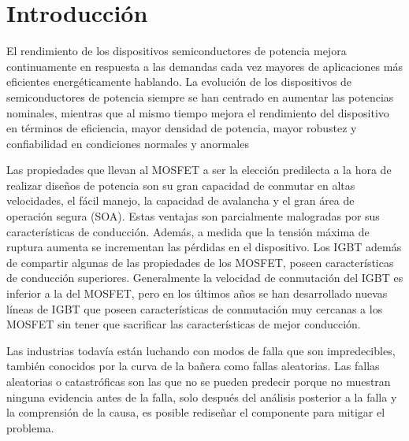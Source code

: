 \documentclass[conference]{IEEEtran}
\begin{document}
\section{Introducción}
\label{sec:intro}

El rendimiento de los dispositivos semiconductores de potencia mejora continuamente en respuesta a las demandas cada vez mayores de aplicaciones más eficientes energéticamente hablando. La evolución de los dispositivos de semiconductores de potencia siempre se han centrado en aumentar las potencias nominales, mientras que al mismo tiempo mejora el rendimiento del dispositivo en términos de eficiencia, mayor densidad de potencia, mayor robustez y confiabilidad en condiciones normales y anormales

Las propiedades que llevan al MOSFET a ser la elección predilecta a la hora de realizar diseños de potencia son su gran capacidad de conmutar en altas velocidades, el fácil manejo, la capacidad de avalancha y el gran área de operación segura (SOA). Estas ventajas son parcialmente malogradas por sus características de conducción. Además, a medida que la tensión máxima de ruptura aumenta se incrementan las pérdidas en el dispositivo. Los IGBT además de compartir algunas de las propiedades de los MOSFET, poseen características de conducción superiores. Generalmente la velocidad de conmutación del IGBT es inferior a la del MOSFET, pero en los últimos años se han desarrollado nuevas líneas de IGBT que poseen características de conmutación muy cercanas a los MOSFET sin tener que sacrificar las características de mejor conducción. 

Las industrias todavía están luchando con modos de falla que son impredecibles, también conocidos por la curva de la bañera \cite{bath} como fallas aleatorias. Las fallas aleatorias o catastróficas son las que no se pueden predecir porque no muestran ninguna evidencia antes de la falla, solo después del análisis posterior a la falla y la comprensión de la causa, es posible rediseñar el componente para mitigar el problema.
\end{document}
